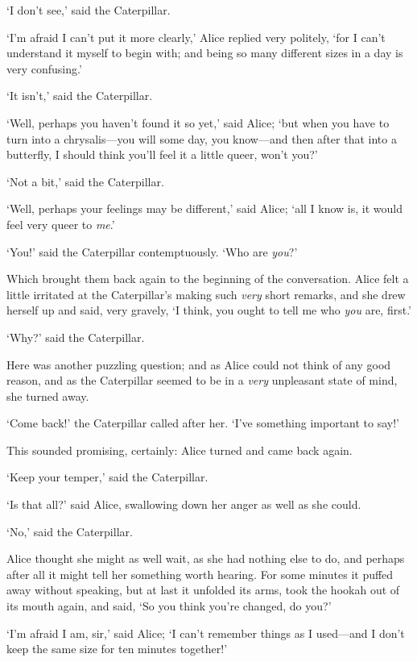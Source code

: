 \documentclass[12pt,openany]{memoir}
\begin{document}
`I don't see,' said the Caterpillar.

`I'm afraid I can't put it more clearly,' Alice replied very politely, `for I can't understand it myself to begin with; and being so many different sizes in a day is very confusing.'

`It isn't,' said the Caterpillar.

`Well, perhaps you haven't found it so yet,' said Alice; `but when you have to turn into a chrysalis---you will some day, you know---and then after that into a butterfly, I should think you'll feel it a little queer, won't you?'

`Not a bit,' said the Caterpillar.

`Well, perhaps your feelings may be different,' said Alice; `all I know is, it would feel very queer to \textit{me}.'

`You!' said the Caterpillar contemptuously. `Who are \textit{you}?'

Which brought them back again to the beginning of the conversation. Alice felt a little irritated at the Caterpillar's making such \textit{very} short remarks, and she drew herself up and said, very gravely, `I think, you ought to tell me who \textit{you} are, first.'

`Why?' said the Caterpillar.

Here was another puzzling question; and as Alice could not think of any good reason, and as the Caterpillar seemed to be in a \textit{very} unpleasant state of mind, she turned away.

`Come back!' the Caterpillar called after her. `I've something important to say!'

This sounded promising, certainly: Alice turned and came back again.

`Keep your temper,' said the Caterpillar.

`Is that all?' said Alice, swallowing down her anger as well as she could.

`No,' said the Caterpillar.

Alice thought she might as well wait, as she had nothing else to do, and perhaps after all it might tell her something worth hearing. For some minutes it puffed away without speaking, but at last it unfolded its arms, took the hookah out of its mouth again, and said, `So you think you're changed, do you?'

`I'm afraid I am, sir,' said Alice; `I can't remember things as I used---and I don't keep the same size for ten minutes together!'
\end{document}
